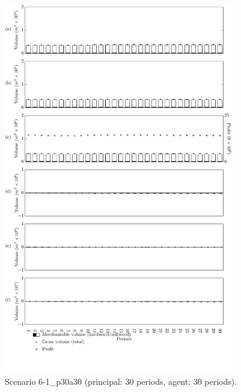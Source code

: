 \begin{figure}[h]
  \centering
  \includegraphics[width=10cm]{images/appendix/s6-1_p30a30}
  \caption{Scenario 6-1\_p30a30 (principal: 30 periods, agent: 30 periods).}
  \label{fig:s6-1_p30a30}
\end{figure}

